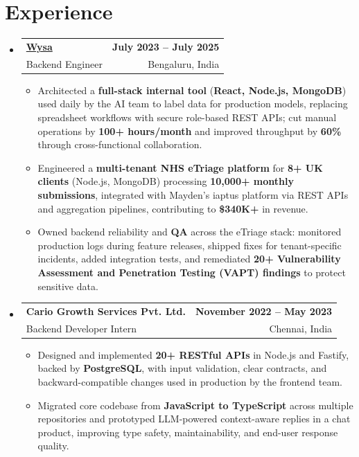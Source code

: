 \documentclass[letterpaper,10pt]{article}
\makeatletter
\newcommand{\resumeItem}[1]{
  \item\small{#1\vspace{-1pt}}
}
\newcommand{\resumeSubheading}[4]{
  \vspace{1pt}\item
    \begin{tabular*}{0.985\textwidth}[t]{l@{\extracolsep{\fill}}r}
      \textbf{#1} & \textbf{\small #2} \\
      {\small\color{ResumeSlate} #3} & {\small\color{ResumeSlate} #4} \\
    \end{tabular*}\vspace{-6pt}
}
\newcommand{\resumeSubHeadingListStart}{\begin{itemize}[leftmargin=0.0in, label={}, itemsep=2pt, topsep=2pt]}
\newcommand{\resumeSubHeadingListEnd}{\end{itemize}}
\newcommand{\resumeItemListStart}{\begin{itemize}[leftmargin=0.18in, itemsep=2pt, topsep=1pt]}
\newcommand{\resumeItemListEnd}{\end{itemize}\vspace{-4pt}}
\makeatother
\begin{document}
\section{Experience}
\resumeSubHeadingListStart
  \resumeSubheading
    {\href{https://www.wysa.io}{Wysa}}{July 2023 -- July 2025}
    {Backend Engineer}{Bengaluru, India}
    \resumeItemListStart
      \resumeItem{Architected a \textbf{full-stack internal tool} (\textbf{React, Node.js, MongoDB}) used daily by the AI team to label data for production models, replacing spreadsheet workflows with secure role-based REST APIs; cut manual operations by \textbf{100+ hours/month} and improved throughput by \textbf{60\%} through cross-functional collaboration.}
      \resumeItem{Engineered a \textbf{multi-tenant NHS eTriage platform} for \textbf{8+ UK clients} (Node.js, MongoDB) processing \textbf{10{,}000+ monthly submissions}, integrated with Mayden's iaptus platform via REST APIs and aggregation pipelines, contributing to \textbf{\$340K+} in revenue.}
      \resumeItem{Owned backend reliability and \textbf{QA} across the eTriage stack: monitored production logs during feature releases, shipped fixes for tenant-specific incidents, added integration tests, and remediated \textbf{20+ Vulnerability Assessment and Penetration Testing (VAPT) findings} to protect sensitive data.}
    \resumeItemListEnd
  \resumeSubheading
    {Cario Growth Services Pvt. Ltd.}{November 2022 -- May 2023}
    {Backend Developer Intern}{Chennai, India}
    \resumeItemListStart
      \resumeItem{Designed and implemented \textbf{20+ RESTful APIs} in Node.js and Fastify, backed by \textbf{PostgreSQL}, with input validation, clear contracts, and backward-compatible changes used in production by the frontend team.}
      \resumeItem{Migrated core codebase from \textbf{JavaScript to TypeScript} across multiple repositories and prototyped LLM-powered context-aware replies in a chat product, improving type safety, maintainability, and end-user response quality.}
    \resumeItemListEnd
\resumeSubHeadingListEnd
\vspace{-4pt}
\end{document}
